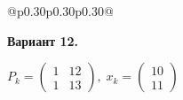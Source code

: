 \documentclass[12pt,a4paper]{article}
\begin{document}
{\begin{longtable}{@{}p{0.30\textwidth}p{0.30\textwidth}p{0.30\textwidth}@{}}
\begin{minipage}[t]{\linewidth}\vspace{0pt}\raggedright\setlength{\parskip}{0pt}
\textbf{Вариант 12.}\par\smallskip
\(\displaystyle  P_k=\begin{pmatrix}1&12\\1&13\end{pmatrix},\; x_k=\begin{pmatrix}10\\11\end{pmatrix}\)\par
\end{minipage}\\\noalign{\vskip 14pt}
\end{longtable}
}

\par\ifdim\dimexpr\pagegoal-\pagetotal\relax<140pt\relax\newpage\fi
\end{document}
